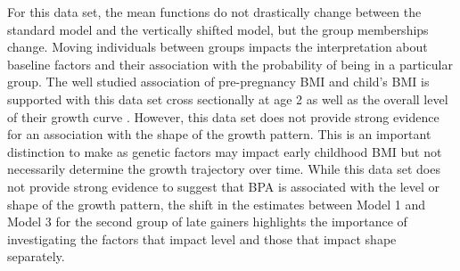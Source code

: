 For this data set, the mean functions do not drastically change between the standard model and the vertically shifted model, but the group memberships change. Moving individuals between groups impacts the interpretation about baseline factors and their association with the probability of being in a particular group. The well studied association of pre-pregnancy BMI and child's BMI is supported with this data set cross sectionally at age 2 as well as the overall level of their growth curve \cite{whitaker1997}. However, this data set does not provide strong evidence for an association with the shape of the growth pattern. This is an important distinction to make as genetic factors may impact early childhood BMI but not necessarily determine the growth trajectory over time. While this data set does not provide strong evidence to suggest that BPA is associated with the level or shape of the growth pattern, the shift in the estimates between Model 1 and Model 3 for the second group of late gainers highlights the importance of investigating the factors that impact level and those that impact shape separately.
